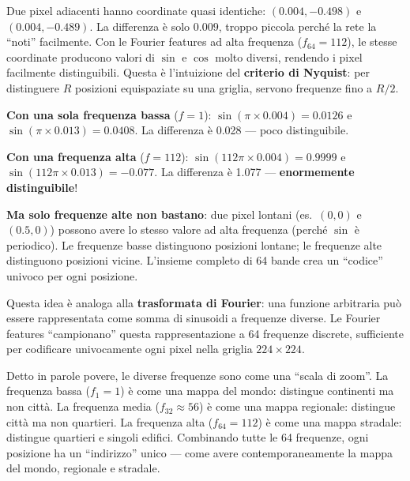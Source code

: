 \documentclass[12pt,a4paper]{article}
\begin{document}
\begin{notabox}[title={Perch\'e le Fourier features e non semplici coordinate $(x, y)$?}]
Due pixel adiacenti hanno coordinate quasi identiche: $(0.004, -0.498)$ e $(0.004, -0.489)$. La differenza \`e solo $0.009$, troppo piccola perch\'e la rete la ``noti'' facilmente. Con le Fourier features ad alta frequenza ($f_{64} = 112$), le stesse coordinate producono valori di $\sin$ e $\cos$ molto diversi, rendendo i pixel facilmente distinguibili. Questa \`e l'intuizione del \textbf{criterio di Nyquist}: per distinguere $R$ posizioni equispaziate su una griglia, servono frequenze fino a $R/2$.
\end{notabox}

\begin{examplebox}
\textbf{Con una sola frequenza bassa} ($f = 1$): $\sin(\pi \times 0.004) = 0.0126$ e $\sin(\pi \times 0.013) = 0.0408$. La differenza \`e 0.028 --- poco distinguibile.

\textbf{Con una frequenza alta} ($f = 112$): $\sin(112\pi \times 0.004) = 0.9999$ e $\sin(112\pi \times 0.013) = -0.077$. La differenza \`e 1.077 --- \textbf{enormemente distinguibile}!

\textbf{Ma solo frequenze alte non bastano}: due pixel lontani (es.\ $(0, 0)$ e $(0.5, 0)$) possono avere lo stesso valore ad alta frequenza (perch\'e $\sin$ \`e periodico). Le frequenze basse distinguono posizioni lontane; le frequenze alte distinguono posizioni vicine. L'insieme completo di 64 bande crea un ``codice'' univoco per ogni posizione.

Questa idea \`e analoga alla \textbf{trasformata di Fourier}: una funzione arbitraria pu\`o essere rappresentata come somma di sinusoidi a frequenze diverse. Le Fourier features ``campionano'' questa rappresentazione a 64 frequenze discrete, sufficiente per codificare univocamente ogni pixel nella griglia $224 \times 224$.
\end{examplebox}

\begin{notabox}
Detto in parole povere, le diverse frequenze sono come una ``scala di zoom''. La frequenza bassa ($f_1 = 1$) \`e come una mappa del mondo: distingue continenti ma non citt\`a. La frequenza media ($f_{32} \approx 56$) \`e come una mappa regionale: distingue citt\`a ma non quartieri. La frequenza alta ($f_{64} = 112$) \`e come una mappa stradale: distingue quartieri e singoli edifici. Combinando tutte le 64 frequenze, ogni posizione ha un ``indirizzo'' unico --- come avere contemporaneamente la mappa del mondo, regionale e stradale.
\end{notabox}
\end{document}

